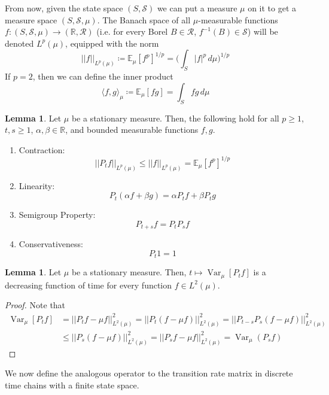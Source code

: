 \documentclass{article}
\DeclareMathOperator{\Var}{Var}
\theoremstyle{definition}
\newtheorem{lemma}[theorem]{Lemma}
\theoremstyle{remark}
\theoremstyle{definition}
\begin{document}
From now, given the state space $(S, \mathcal{S})$ we can put a measure $\mu$ on it to get a measure space $(S, \mathcal{S}, \mu)$. The Banach space of all $\mu$-measurable functions $f: (S, \mathcal{S}, \mu) \rightarrow (\mathbb{R}, \mathcal{R})$ (i.e. for every Borel $B \in \mathcal{R}$, $f^{-1}(B) \in \mathcal{S}$) will be denoted $L^p (\mu)$, equipped with the norm 
\[||f||_{L^p(\mu)} \coloneqq \mathbb{E}_\mu [f^p]^{1/p} = \bigg( \int_S |f|^p \,d\mu \bigg)^{1/p}\]
If $p = 2$, then we can define the inner product 
\[\langle f, g \rangle_\mu \coloneqq \mathbb{E}_\mu [f g] = \int_S f g \, d\mu\]

\begin{lemma}
Let $\mu$ be a stationary measure. Then, the following hold for all $p \geq 1$, $t, s \geq 1$, $\alpha, \beta \in \mathbb{R}$, and bounded measurable functions $f, g$. 
\begin{enumerate}
    \item Contraction: 
    \[||P_t f||_{L^p(\mu)} \leq ||f||_{L^p (\mu)} = \mathbb{E}_\mu [f^p]^{1/p}\]
    
    \item Linearity: 
    \[P_t (\alpha f + \beta g) = \alpha P_t f + \beta P_t g\] 
    
    \item Semigroup Property: 
    \[P_{t + s} f = P_t P_s f\]
    
    \item Conservativeness: 
    \[P_t 1 = 1\]
\end{enumerate}
\end{lemma}

\begin{lemma}
Let $\mu$ be a stationary measure. Then, $t \mapsto \Var_\mu [P_t f]$ is a decreasing function of time for every function $f \in L^2 (\mu)$. 
\end{lemma}
\begin{proof}
Note that 
\begin{align*}
    \Var_\mu [P_t f] & = ||P_t f - \mu f||^2_{L^2(\mu) } =  ||P_t (f - \mu f)||^2_{L^2 (\mu)} = ||P_{t - s} P_s (f - \mu f)||^2_{L^2 (\mu)} \\
    & \leq ||P_s (f - \mu f)||^2_{L^2 (\mu)} = ||P_s f - \mu f||^2_{L^2 (\mu)} = \Var_\mu (P_s f)
\end{align*}
\end{proof}

We now define the analogous operator to the transition rate matrix in discrete time chains with a finite state space. 
\end{document}
